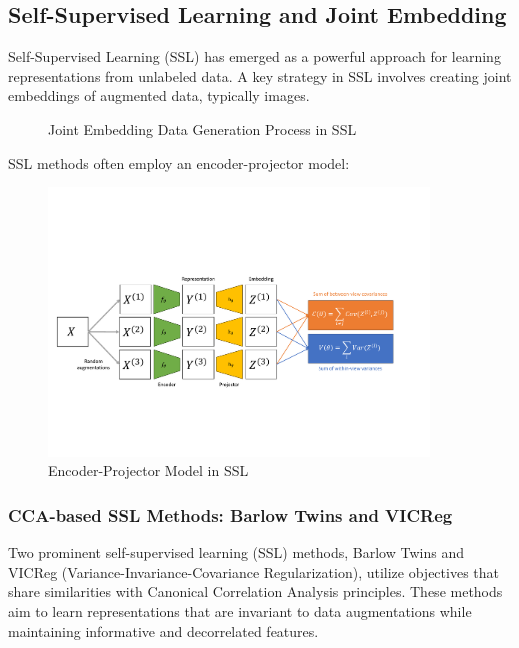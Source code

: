 \subsection{Self-Supervised Learning and Joint Embedding}

Self-Supervised Learning (SSL) has emerged as a powerful approach for learning representations from unlabeled data. A key strategy in SSL involves creating joint embeddings of augmented data, typically images.

\begin{figure}
\centering
{}
\caption{Joint Embedding Data Generation Process in SSL}
\label{fig:joint_embedding}
\end{figure}

SSL methods often employ an encoder-projector model:

\begin{figure}
\centering
\includegraphics[width=0.9\textwidth]{figures/ssl_schematic}
\caption{Encoder-Projector Model in SSL}
\label{fig:sslschematic}
\end{figure}

\subsubsection{CCA-based SSL Methods: Barlow Twins and VICReg}

Two prominent self-supervised learning (SSL) methods, Barlow Twins and VICReg (Variance-Invariance-Covariance Regularization), utilize objectives that share similarities with Canonical Correlation Analysis principles. These methods aim to learn representations that are invariant to data augmentations while maintaining informative and decorrelated features.


